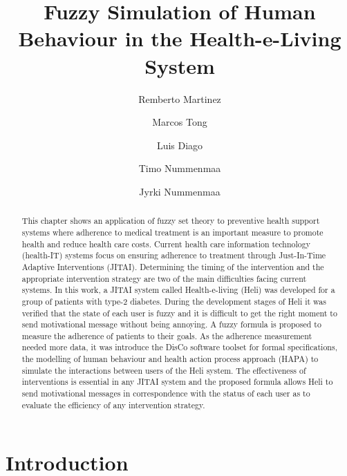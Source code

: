 \documentclass{llncs}
\begin{document}
\title{Fuzzy Simulation of Human Behaviour in the Health-e-Living System}

\author{Remberto Martinez \and Marcos Tong \and Luis Diago \and Timo Nummenmaa \and Jyrki Nummenmaa }


\maketitle
%
\begin{abstract}

This chapter shows an application of fuzzy set theory to preventive health support systems where adherence to medical treatment is an important measure to promote health and reduce health care costs. Current health care information technology (health-IT) systems focus on ensuring adherence to treatment through Just-In-Time Adaptive Interventions (JITAI). Determining the timing of the intervention and the appropriate intervention strategy are two of the main difficulties facing current systems. In this work, a JITAI system called Health-e-living (Heli) was developed for a group of patients with type-2 diabetes. During the development stages of Heli it was verified that the state of each user is fuzzy and it is difficult to get the right moment to send motivational message without being annoying. A fuzzy formula is proposed to measure the adherence of patients to their goals. 
As the adherence measurement needed more data, it was introduce the DisCo software toolset for formal specifications, the modelling of human behaviour and health action process approach (HAPA) to simulate the interactions between users of the Heli system. The effectiveness of interventions is essential in any JITAI system and the proposed formula allows Heli to send motivational messages in correspondence with the status of each user as to evaluate the efficiency of any intervention strategy.

\end{abstract}



\section{Introduction}
\end{document}
